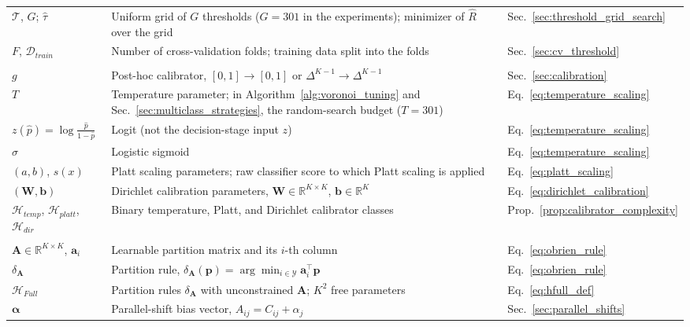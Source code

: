 {\begin{longtable}{@{}l >{\raggedright\arraybackslash}p{8cm} l@{}}
$\mathcal{T}$, $G$; $\hat\tau$ & Uniform grid of $G$ thresholds ($G = 301$ in the experiments); minimizer of $\hat R$ over the grid & Sec.~\ref{sec:threshold_grid_search} \\
$F$, $\mathcal{D}_{train}$ & Number of cross-validation folds; training data split into the folds & Sec.~\ref{sec:cv_threshold} \\
\addlinespace
\multicolumn{3}{@{}l}{\textit{Calibration}}\\
\midrule
$g$ & Post-hoc calibrator, $[0,1] \to [0,1]$ or $\Delta^{K-1} \to \Delta^{K-1}$ & Sec.~\ref{sec:calibration} \\
$T$ & Temperature parameter; in Algorithm~\ref{alg:voronoi_tuning} and Sec.~\ref{sec:multiclass_strategies}, the random-search budget ($T = 301$) & Eq.~\eqref{eq:temperature_scaling} \\
$z(\hat{p}) = \log\!\frac{\hat{p}}{1 - \hat{p}}$ & Logit (not the decision-stage input $z$) & Eq.~\eqref{eq:temperature_scaling} \\
$\sigma$ & Logistic sigmoid & Eq.~\eqref{eq:temperature_scaling} \\
$(a, b)$, $s(x)$ & Platt scaling parameters; raw classifier score to which Platt scaling is applied & Eq.~\eqref{eq:platt_scaling} \\
$(\mathbf{W}, \mathbf{b})$ & Dirichlet calibration parameters, $\mathbf{W} \in \mathbb{R}^{K \times K}$, $\mathbf{b} \in \mathbb{R}^K$ & Eq.~\eqref{eq:dirichlet_calibration} \\
$\mathcal{H}_{temp}$, $\mathcal{H}_{platt}$, $\mathcal{H}_{dir}$ & Binary temperature, Platt, and Dirichlet calibrator classes & Prop.~\ref{prop:calibrator_complexity} \\
\addlinespace
\multicolumn{3}{@{}l}{\textit{Multiclass partitions}}\\
\midrule
$\mathbf{A} \in \mathbb{R}^{K \times K}$, $\mathbf{a}_i$ & Learnable partition matrix and its $i$-th column & Eq.~\eqref{eq:obrien_rule} \\
$\delta_{\mathbf{A}}$ & Partition rule, $\delta_{\mathbf{A}}(\mathbf{p}) = \arg\min_{i \in \mathcal{Y}} \mathbf{a}_i^\top \mathbf{p}$ & Eq.~\eqref{eq:obrien_rule} \\
$\mathcal{H}_{Full}$ & Partition rules $\delta_{\mathbf{A}}$ with unconstrained $\mathbf{A}$; $K^2$ free parameters & Eq.~\eqref{eq:hfull_def} \\
$\boldsymbol{\alpha}$ & Parallel-shift bias vector, $A_{ij} = C_{ij} + \alpha_j$ & Sec.~\ref{sec:parallel_shifts} \\

\end{longtable}}
